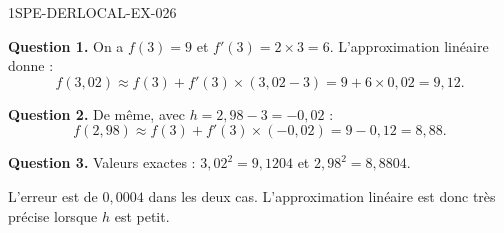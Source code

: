 \begin{corrige}{1SPE-DERLOCAL-EX-026}

\textbf{Question 1.} On a $f(3) = 9$ et $f'(3) = 2 \times 3 = 6$. L'approximation linéaire donne :
\[
f(3{,}02) \approx f(3) + f'(3) \times (3{,}02 - 3) = 9 + 6 \times 0{,}02 = \boxed{9{,}12}.
\]

\textbf{Question 2.} De même, avec $h = 2{,}98 - 3 = -0{,}02$ :
\[
f(2{,}98) \approx f(3) + f'(3) \times (-0{,}02) = 9 - 0{,}12 = \boxed{8{,}88}.
\]

\textbf{Question 3.} Valeurs exactes : $3{,}02^2 = 9{,}1204$ et $2{,}98^2 = 8{,}8804$.

L'erreur est de $0{,}0004$ dans les deux cas. L'approximation linéaire est donc très précise lorsque $h$ est petit.

\end{corrige}
